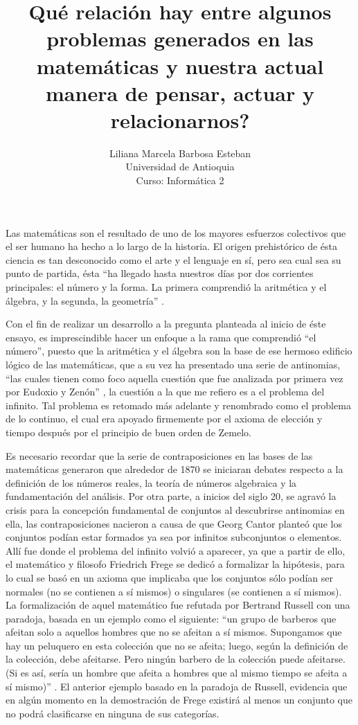 \documentclass[letterpaper, 12 pt, conference]{ieeeconf}  %
\title{\LARGE \bf
\textquestiondown Qu\'{e} relaci\'{o}n hay entre algunos problemas generados en las matem\'{a}ticas y nuestra actual manera de pensar, actuar y relacionarnos?
}
\author{Liliana Marcela Barbosa Esteban\\%
Universidad de Antioquia \\
Curso: Inform\'{a}tica 2
}
\begin{document}
\maketitle
\thispagestyle{empty}
\pagestyle{empty}


\begin{.}

Las matemáticas son el resultado de uno de los mayores esfuerzos colectivos que el ser humano ha hecho a lo largo de la historia. El origen prehistórico de ésta ciencia es tan desconocido como el arte y el lenguaje en sí, pero sea cual sea su punto de partida, ésta “ha llegado hasta nuestros días por dos corrientes principales: el número y la forma. La primera comprendió la aritmética y el álgebra, y la segunda, la geometría” \cite{c9}.

Con el fin de realizar un desarrollo a la pregunta planteada al inicio de éste ensayo, es imprescindible hacer un enfoque a la rama que comprendió “el número”, puesto que la aritmética y el álgebra son la base de ese hermoso edificio lógico de las matemáticas, que a su vez ha presentado una serie de antinomias, “las cuales tienen como foco aquella cuestión que fue analizada por primera vez por Eudoxio y Zenón” \cite{c10}, la cuestión a la que me refiero es a el problema del infinito. Tal problema es retomado más adelante y renombrado como el problema de lo continuo, el cual era apoyado firmemente por el axioma de elección y tiempo después por el principio de buen orden de Zemelo.

Es necesario recordar que la serie de contraposiciones en las bases de las matemáticas generaron que alrededor de 1870 se iniciaran debates respecto a la definición de los números reales, la teoría de números algebraica y la fundamentación del análisis. Por otra parte, a inicios del siglo 20, se agravó la crisis para la concepción fundamental de conjuntos al descubrirse antinomias en ella, las contraposiciones nacieron a causa de que Georg Cantor planteó que los conjuntos podían estar formados ya sea por infinitos subconjuntos o elementos. Allí fue donde el problema del infinito volvió a aparecer, ya que a partir de ello, el matemático y filosofo Friedrich Frege se dedicó a formalizar la hipótesis, para lo cual se basó en un axioma que implicaba que los conjuntos sólo podían ser normales (no se contienen a sí mismos) o singulares (se contienen a sí mismos). La formalización de aquel matemático fue refutada por Bertrand Russell con una paradoja, basada en un ejemplo como el siguiente: “un grupo de barberos que afeitan solo a aquellos hombres que no se afeitan a sí mismos. Supongamos que hay un peluquero en esta colección que no se afeita; luego, según la definición de la colección, debe afeitarse. Pero ningún barbero de la colección puede afeitarse. (Si es así, sería un hombre que afeita a hombres que al mismo tiempo se afeita a sí mismo)” \cite{c11}. El anterior ejemplo basado en la paradoja de Russell, evidencia que en algún momento en la demostración de Frege existirá al menos un conjunto que no podrá clasificarse en ninguna de sus categorías.


\end{.}
\end{document}
